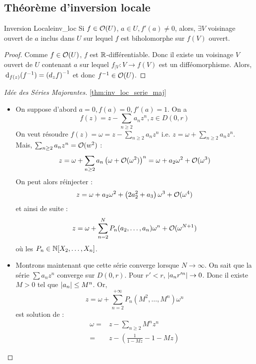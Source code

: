 \documentclass{cours}
\begin{document}
\subsection{Théorème d'inversion locale}
\begin{théorème}{Inversion Locale}{inv_loc}
    Si $f\in \mathcal{O}(U)$, $a \in U, f'(a) \neq 0$, alors, $\exists V$ voisinage ouvert de $a$ inclus dans $U$ sur lequel $f$ est biholomorphe sur $f(V)$ ouvert. 
\end{théorème}
\begin{proof}
    Comme $f\in \mathcal{O}(U)$, $f$ est $\mathbb{R}$-différentiable. Donc il existe un voisinage $V$ ouvert de $U$ contenant $a$ sur lequel $f_{\mid V} : V \to f(V)$ est un difféomorphisme. Alors, ${\rm \, d}_{f(z)}(f^{-1}) = \left(d_{z} f\right)^{-1}$ et donc $f^{-1} \in \mathcal{O}(U)$.
\end{proof}
\begin{proof}[Idée des Séries Majorantes]\ref{thm:inv_loc_serie_maj}
    \begin{itemize}
        \item On suppose d'abord $a = 0, f(a) = 0, f'(a) = 1$. On a 
        \[
            f(z) = z - \sum_{n \geq 2}a_{n}z^{n}, z\in D(0, r)
        \]
        On veut résoudre $f(z) = \omega = z - \sum_{n \geq 2} a_{n}z^{n}$ i.e. $z = \omega + \sum_{n \geq 2}a_{n}z^{n}$. Mais, $\sum_{n \geq 2}a_{n}z^{n} = \mathcal{O}(w^{2})$ : 
        \[
            z = \omega + \sum_{n \geq 2}a_{n}\left(\omega + \mathcal{O}(\omega^{2})\right)^{n} = \omega + a_{2}\omega^{2} + \mathcal{O}(\omega^{3})
        \]
        On peut alors réinjecter : 
        \[
            z = \omega + a_{2}\omega^{2} + \left(2a_{2}^{2} + a_{3}\right)\omega^{3} + \mathcal{O}(\omega^{4})
        \]
        et ainsi de suite : 
        \[
            z = \omega + \sum_{n = 2}^{N}P_{n}(a_{2}, \ldots, a_{n})\omega^{n} + \mathcal{O}(\omega^{N+1})
        \]
        où les $P_{n} \in \mathbb{N}[X_{2}, \ldots, X_{n}]$.
        \item Montrons maintenant que cette série converge lorsque $N \to \infty$. On sait que la série $\sum a_{n}z^{n}$ converge sur $D(0, r)$. Pour $r' < r$, $\left|a_{n}r'^{n}\right| \to 0$. Donc il existe $M > 0$ tel que $\left|a_{n}\right|\leq M^{n}$. Or, \[z = \omega + \sum_{n = 2}^{+ \infty}P_{n}\left(M^{2}, \ldots, M^{n}\right)\omega^{n}\] est solution de :
        \[
            \begin{aligned}
                \omega =& z - \sum_{n \geq 2}M^{n}z^{n}\\
                =& z - \left(\frac{1}{1 - Mz} - 1 - Mz\right)
            \end{aligned}
\]
\end{itemize}
\end{proof}
\end{document}
